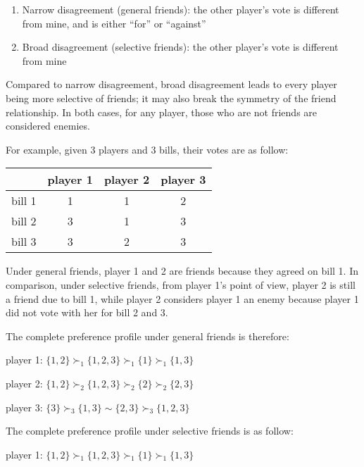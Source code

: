 \begin{enumerate}
  \item Narrow disagreement (general friends): the other player's vote is different from mine, and is either ``for'' or ``against''
  \item Broad disagreement (selective friends): the other player's vote is different from mine
\end{enumerate}

Compared to narrow disagreement, broad disagreement leads to every player being
more selective of friends; it may also break the symmetry of the friend
relationship.
In both cases, for any player, those who are not friends are considered enemies.

\begin{example}
\label{example:votes_friends}
  For example, given 3 players and 3 bills, their votes are as follow:

  \begin{table}[h!]
  \centering
  \begin{tabular}{|c|c|c|c|}
  \hline
         & player 1 & player 2 & player 3 \\ \hline
  bill 1 & 1 & 1 & 2 \\
  bill 2 & 3 & 1 & 3 \\
  bill 3 & 3 & 2 & 3 \\
  \hline
  \end{tabular}
  \end{table}

\end{example}

Under general friends, player 1 and 2 are friends because they agreed on bill 1.
In comparison, under selective friends, from player 1's point of view, player 2
is still a friend due to bill 1, while player 2 considers player 1 an enemy
because player 1 did not vote with her for bill 2 and 3.

The complete preference profile under general friends is therefore:

player 1: $\{1, 2\} \succ_1 \{1, 2, 3\} \succ_1 \{1\} \succ_1 \{1, 3\} $

player 2: $\{1, 2\} \succ_2 \{1, 2, 3\} \succ_2 \{2\} \succ_2 \{2, 3\}$

player 3: $\{3\} \succ_3 \{1, 3\} \sim \{2, 3\} \succ_3 \{1, 2, 3\}$

The complete preference profile under selective friends is as follow:

player 1: $\{1, 2\} \succ_1 \{1, 2, 3\} \succ_1 \{1\} \succ_1 \{1, 3\} $

